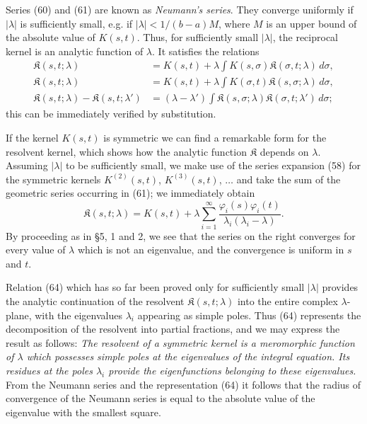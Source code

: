 Series (60) and (61) are known as \emph{Neumann's series}. They converge uniformly if $|\lambda|$ is sufficiently small, e.g. if $|\lambda|<1/(b-a)M$, where $M$ is an upper bound of the absolute value of $K(s,t)$. Thus, for sufficiently small $|\lambda|$, the reciprocal kernel is an analytic function of $\lambda$. It satisfies the relations
\begin{equation}\tag{63}
\begin{aligned}
\mathfrak{K}(s,t;\lambda)
&=K(s,t)+\lambda\int K(s,\sigma)\mathfrak{K}(\sigma,t;\lambda)\,d\sigma,\\
\mathfrak{K}(s,t;\lambda)
&=K(s,t)+\lambda\int K(\sigma,t)\mathfrak{K}(s,\sigma;\lambda)\,d\sigma,\\
\mathfrak{K}(s,t;\lambda)-\mathfrak{K}(s,t;\lambda')
&=(\lambda-\lambda')\int \mathfrak{K}(s,\sigma;\lambda)\mathfrak{K}(\sigma,t;\lambda')\,d\sigma;
\end{aligned}
\end{equation}
this can be immediately verified by substitution.

If the kernel $K(s,t)$ is symmetric we can find a remarkable form for the resolvent kernel, which shows how the analytic function $\mathfrak{K}$ depends on $\lambda$. Assuming $|\lambda|$ to be sufficiently small, we make use of the series expansion (58) for the symmetric kernels $K^{(2)}(s,t)$, $K^{(3)}(s,t)$, $\ldots$ and take the sum of the geometric series occurring in (61); we immediately obtain
\begin{equation}\tag{64}
\mathfrak{K}(s,t;\lambda)
=K(s,t)+\lambda\sum_{i=1}^{\infty}
\frac{\varphi_i(s)\varphi_i(t)}{\lambda_i(\lambda_i-\lambda)}.
\end{equation}
By proceeding as in \S5, 1 and 2, we see that the series on the right converges for every value of $\lambda$ which is not an eigenvalue, and the convergence is uniform in $s$ and $t$.

Relation (64) which has so far been proved only for sufficiently small $|\lambda|$ provides the analytic continuation of the resolvent $\mathfrak{K}(s,t;\lambda)$ into the entire complex $\lambda$-plane, with the eigenvalues $\lambda_i$ appearing as simple poles. Thus (64) represents the decomposition of the resolvent into partial fractions, and we may express the result as follows: \emph{The resolvent of a symmetric kernel is a meromorphic function of $\lambda$ which possesses simple poles at the eigenvalues of the integral equation. Its residues at the poles $\lambda_i$ provide the eigenfunctions belonging to these eigenvalues.} From the Neumann series and the representation (64) it follows that the radius of convergence of the Neumann series is equal to the absolute value of the eigenvalue with the smallest square.

